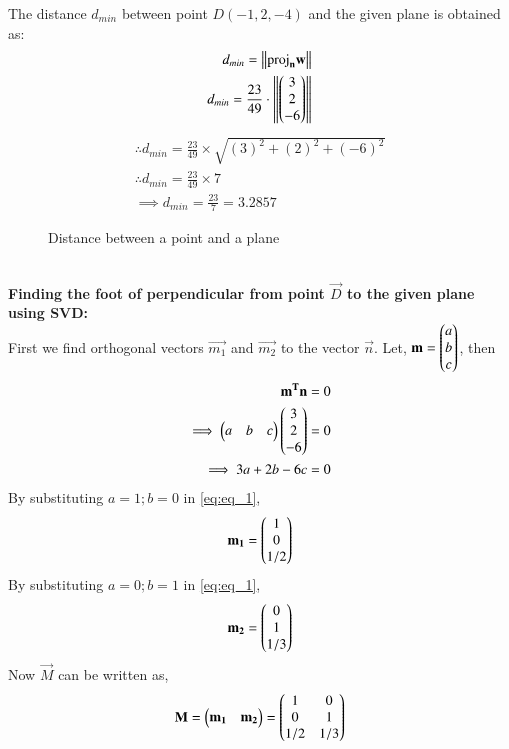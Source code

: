 \documentclass[journal,12pt,twocolumn]{IEEEtran}
\begin{document}
The distance $d_{min}$ between point $D(-1, 2, -4)$ and the given plane  is obtained as:
\begin{align}
    d_{min}=\left\lVert\text{proj}_\mathbf{n}\mathbf{w}\right\rVert\\
    d_{min}=\frac{23}{49}\cdot\left\lVert\begin{pmatrix}3\\2\\-6\end{pmatrix}\right\rVert
\end{align}
\begin{align}
    \therefore d_{min}=\frac{23}{49} \times \sqrt{(3)^2+(2)^2+(-6)^2}\\
    \therefore d_{min}=\frac{23}{49} \times 7\\
    \implies \boxed{d_{min}=\frac{23}{7}= 3.2857}
\end{align}
\begin{figure}[h!]
\centering
\resizebox{\columnwidth}{!}
    {
    
    }
    \caption{Distance between a point and a plane}
\end{figure}
\\
\textbf{Finding the foot of perpendicular from point $\vec{D}$ to the given plane using SVD:}\\
First we find orthogonal vectors $\vec{m_1}$ and $\vec{m_2}$ to the vector $\vec{n}$. Let, $\mathbf{m} = \begin{pmatrix}a\\b\\c\end{pmatrix}$, then
\begin{align}
\mathbf{m^T}\mathbf{n} &= 0 \nonumber \\
\implies \begin{pmatrix}a & b & c\end{pmatrix} \begin{pmatrix}3 \\ 2 \\ -6\end{pmatrix} &= 0 \nonumber \\
\implies 3a+2b-6c &= 0 \label{eq:eq_1}
\end{align}
By substituting $a=1;b=0$ in \eqref{eq:eq_1},
\begin{align} \label{eq:eq_2}
    \mathbf{m_1} = \begin{pmatrix}1 \\ 0 \\ 1/2\end{pmatrix} 
\end{align}
By substituting $a=0;b=1$ in \eqref{eq:eq_1},
\begin{align} \label{eq:eq_3}
    \mathbf{m_2} = \begin{pmatrix}0 \\ 1 \\ 1/3\end{pmatrix} 
\end{align}
Now $\vec{M}$ can be written as,
\begin{align} \label{eq:eq_4}
    \mathbf{M} = \begin{pmatrix}\mathbf{m_1} & \mathbf{m_2}\end{pmatrix} = \begin{pmatrix}1 & 0 \\ 0 & 1 \\ 1/2 & 1/3\end{pmatrix}
\end{align}
\end{document}
